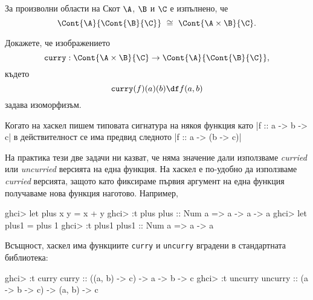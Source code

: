 \begin{framed}
  \begin{proposition}
    За произволни области на Скот $\A$, $\B$ и $\C$ е изпълнено, че
    \[\Cont{\A}{\Cont{\B}{\C}}\ \cong\ \Cont{\A\times\B}{\C}.\]
  \end{proposition}  
\end{framed}
\begin{hint}
    Докажете, че изображението
    \[\texttt{curry}:\Cont{\A\times \B}{\C} \to \Cont{\A}{\Cont{\B}{\C}},\]
    където
    \[\texttt{curry}(f)(a)(b) \df f(a,b)\]
    задава изоморфизъм.
\end{hint}

\begin{remark}
  Когато на хаскел пишем типовата сигнатура на някоя функция като 
  |f :: a -> b -> c|
  в действителност се има предвид следното
  |f :: a -> (b -> c)|
  
  На практика тези две задачи ни казват, че няма значение дали използваме {\em curried}
  или {\em uncurried} версията на една функция. На хаскел е по-удобно да използваме {\em curried}
  версията, защото като фиксираме първия аргумент на една функция получаваме нова функция наготово.
  Например, 
  \begin{haskellcode}
ghci> let plus x y = x + y
ghci> :t plus
plus :: Num a => a -> a -> a
ghci> let plus1 = plus 1
ghci> :t plus1
plus1 :: Num a => a -> a
   \end{haskellcode}

  Всъщност, хаскел има функциите \texttt{curry} и \texttt{uncurry} вградени в стандартната библиотека:
  \begin{haskellcode}
ghci> :t curry
curry :: ((a, b) -> c) -> a -> b -> c
ghci> :t uncurry
uncurry :: (a -> b -> c) -> (a, b) -> c
  \end{haskellcode}
\end{remark}

